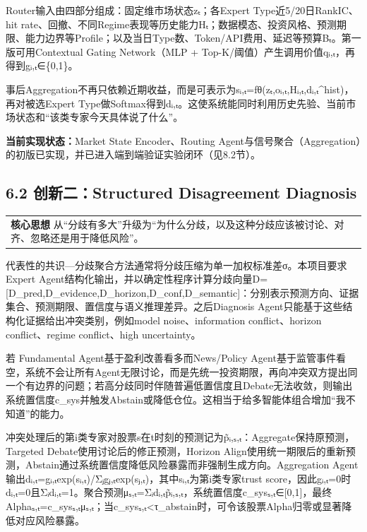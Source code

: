 \documentclass[12pt,a4paper]{ctexart}
\begin{document}
Router输入由四部分组成：固定维市场状态zₜ；各Expert
Type近5/20日RankIC、hit
rate、回撤、不同Regime表现等历史能力Hₜ；数据模态、投资风格、预测期限、能力边界等Profile；以及当日Type数、Token/API费用、延迟等预算Bₜ。第一版可用Contextual
Gating Network（MLP + Top-K/阈值）产生调用价值qᵢ,ₜ，再得到gᵢ,ₜ∈\{0,1\}。

事后Aggregation不再只依赖近期收益，而是可表示为sᵢ,ₜ=fθ(zₜ,oᵢ,ₜ,Hᵢ,ₜ,dᵢ,ₜ\^{}hist)，再对被选Expert
Type做Softmax得到dᵢ,ₜ。这使系统能同时利用历史先验、当前市场状态和``该类专家今天具体说了什么''。

\textbf{当前实现状态：}Market State Encoder、Routing
Agent与信号聚合（Aggregation）的初版已实现，并已进入端到端验证实验闭环（见8.2节）。

\subsection{\texorpdfstring{\textbf{6.2 创新二：Structured Disagreement
Diagnosis}}{6.2 创新二：Structured Disagreement Diagnosis}}\label{ux521bux65b0ux4e8cstructured-disagreement-diagnosis}

\begin{longtable}[]{@{}
  >{\raggedright\arraybackslash}p{}@{}}
\toprule\noalign{}
\endhead
\bottomrule\noalign{}
\endlastfoot
\textbf{核心思想}
从``分歧有多大''升级为``为什么分歧，以及这种分歧应该被讨论、对齐、忽略还是用于降低风险''。 \\
\end{longtable}

代表性的共识---分歧聚合方法通常将分歧压缩为单一加权标准差σ。本项目要求Expert
Agent结构化输出，并以确定性程序计算分歧向量D={[}D\_pred,D\_evidence,D\_horizon,D\_conf,D\_semantic{]}：分别表示预测方向、证据集合、预测期限、置信度与语义推理差异。之后Diagnosis
Agent只能基于这些结构化证据给出冲突类别，例如model noise、information
conflict、horizon conflict、regime conflict、high uncertainty。

若 Fundamental Agent基于盈利改善看多而News/Policy
Agent基于监管事件看空，系统不会让所有Agent无限讨论，而是先统一投资期限，再向冲突双方提出同一个有边界的问题；若高分歧同时伴随普遍低置信度且Debate无法收敛，则输出系统置信度c\_sys并触发Abstain或降低仓位。这相当于给多智能体组合增加``我不知道''的能力。

冲突处理后的第i类专家对股票s在t时刻的预测记为p̃ᵢ,ₛ,ₜ：Aggregate保持原预测，Targeted
Debate使用讨论后的修正预测，Horizon
Align使用统一期限后的重新预测，Abstain通过系统置信度降低风险暴露而非强制生成方向。Aggregation
Agent输出dᵢ,ₜ=gᵢ,ₜexp(sᵢ,ₜ)/Σⱼgⱼ,ₜexp(sⱼ,ₜ)，其中sᵢ,ₜ为第i类专家trust
score，因此gᵢ,ₜ=0时dᵢ,ₜ=0且Σᵢdᵢ,ₜ=1。聚合预测μₛ,ₜ=Σᵢdᵢ,ₜp̃ᵢ,ₛ,ₜ，系统置信度c\_sysₛ,ₜ∈{[}0,1{]}，最终Alphaₛ,ₜ=c\_sysₛ,ₜμₛ,ₜ；当c\_sysₛ,ₜ\textless τ\_abstain时，可令该股票Alpha归零或显著降低对应风险暴露。
\end{document}
